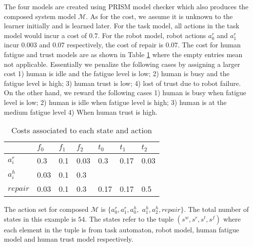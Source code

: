 \documentclass[journal]{IEEEtran}
\begin{document}
The four models are created using PRISM model checker \cite{kwiatkowska2011prism} which also produces the composed system model $\mathcal{M}$. As for the cost, we assume it is unknown to the learner initially and is learned later. For the task model, all actions in the task model would incur a cost of $0.7$. For the robot model, robot actions $a_0^r$ and $a_1^r$ incur $0.003$ and $0.07$ respectively, the cost of repair is $0.07$. The cost for human fatigue and trust models are as shown in Table \ref{table:cost} where the empty entries mean not applicable. Essentially we penalize the following cases by assigning a larger cost 1) human is idle and the fatigue level is low; 2) human is busy and the fatigue level is high; 3) human trust is low; 4) lost of trust due to robot failure. On the other hand, we reward the following cases 1) human is busy when fatigue level is low; 2) human is idle when fatigue level is high; 3) human is at the medium fatigue level 4) When human trust is high. 
\begin{table}[t]
	\centering
	\begin{tabular}{|l|l|l|l|l|l|l|}
		\hline
		& $f_0$ & $f_1$ & $f_2$ & $t_0$ & $t_1$ & $t_2$\\ 
		\hline
		$a_i^r$ & 0.3 & 0.1  & 0.03 & 0.3 & 0.17 & 0.03  \\
		\hline
		$a_i^h$ & 0.03 & 0.1 & 0.3 &  & &   \\
		\hline
		$repair$& 0.03  & 0.1 & 0.3   & 0.17 & 0.17 & 0.5  \\
		
		\hline
		
	\end{tabular}
	\caption{Costs associated to each state and action }
	\label{table:cost}
\end{table}

The action set for composed $\mathcal{M}$ is $\{a_0^r,a_1^r,a_0^h,$ $a_1^h,a_2^h,repair\}$. The total number of states in this example is $54$. The states refer to the tuple $(s^w,s^r,s^t,s^f)$ where each element in the tuple is from task automaton, robot model, human fatigue model and human trust model respectively. 
\end{document}

